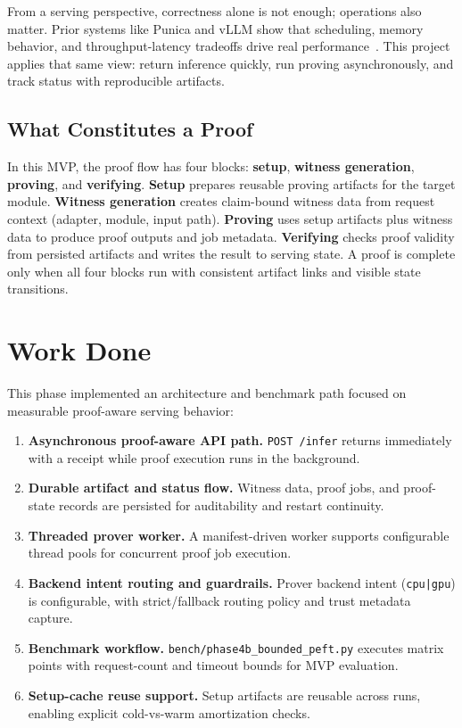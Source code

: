 \documentclass[manuscript,nonacm]{acmart}
\begin{document}
From a serving perspective, correctness alone is not enough; operations also matter. Prior systems like Punica and vLLM show that scheduling, memory behavior, and throughput-latency tradeoffs drive real performance~\cite{chen2023punica,kwon2023pagedattention}. This project applies that same view: return inference quickly, run proving asynchronously, and track status with reproducible artifacts.

\subsection{What Constitutes a Proof}

In this MVP, the proof flow has four blocks: \textbf{setup}, \textbf{witness generation}, \textbf{proving}, and \textbf{verifying}. \textbf{Setup} prepares reusable proving artifacts for the target module. \textbf{Witness generation} creates claim-bound witness data from request context (adapter, module, input path). \textbf{Proving} uses setup artifacts plus witness data to produce proof outputs and job metadata. \textbf{Verifying} checks proof validity from persisted artifacts and writes the result to serving state. A proof is complete only when all four blocks run with consistent artifact links and visible state transitions.

\section{Work Done}

This phase implemented an architecture and benchmark path focused on measurable proof-aware serving behavior:

\begin{enumerate}
    \item \textbf{Asynchronous proof-aware API path.} \texttt{POST /infer} returns immediately with a receipt while proof execution runs in the background.
    \item \textbf{Durable artifact and status flow.} Witness data, proof jobs, and proof-state records are persisted for auditability and restart continuity.
    \item \textbf{Threaded prover worker.} A manifest-driven worker supports configurable thread pools for concurrent proof job execution.
    \item \textbf{Backend intent routing and guardrails.} Prover backend intent (\texttt{cpu|gpu}) is configurable, with strict/fallback routing policy and trust metadata capture.
    \item \textbf{Benchmark workflow.} \texttt{bench/phase4b\_bounded\_peft.py} executes matrix points with request-count and timeout bounds for MVP evaluation.
    \item \textbf{Setup-cache reuse support.} Setup artifacts are reusable across runs, enabling explicit cold-vs-warm amortization checks.
\end{enumerate}
\end{document}
